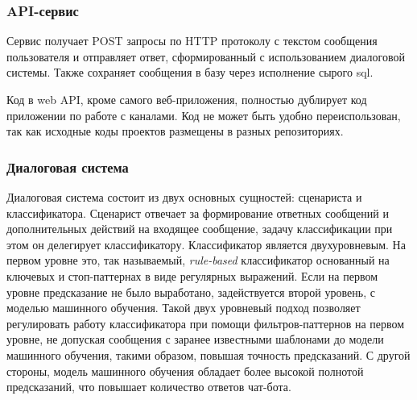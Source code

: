     \subsubsection*{API-сервис}
    Сервис получает POST запросы по HTTP протоколу с текстом сообщения пользователя и отправляет ответ,
    сформированный с использованием диалоговой системы. Также сохраняет сообщения в базу через исполнение сырого sql.

    Код в web API, кроме самого веб-приложения, полностью дублирует код приложении по работе с каналами.
    Код не может быть удобно переиспользован, так как исходные коды проектов размещены в разных
    репозиториях.

    \subsubsection*{Диалоговая система}
    Диалоговая система состоит из двух основных сущностей: сценариста и классификатора. Сценарист отвечает за формирование ответных
    сообщений и дополнительных действий на входящее сообщение, задачу классификации при этом он делегирует классификатору.
    Классификатор является двухуровневым. На первом уровне это, так называемый, \textit{rule-based} классификатор
    основанный на ключевых и стоп-паттернах в виде регулярных выражений. Если на первом уровне предсказание не было выработано,
    задействуется второй уровень, с моделью машинного обучения. Такой двух уровневый подход позволяет
    регулировать работу классификатора при помощи фильтров-паттернов на первом уровне, не допуская сообщения с
    заранее известными шаблонами до модели машинного обучения, такими образом, повышая точность предсказаний.
    С другой стороны, модель машинного обучения обладает более высокой полнотой предсказаний, что повышает
    количество ответов чат-бота.

